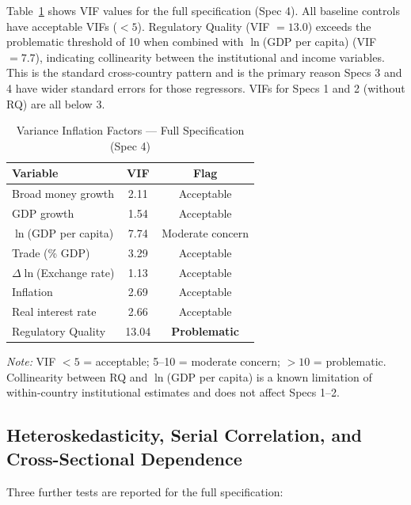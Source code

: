 Table~\ref{tab:vif-full} shows VIF values for the full specification (Spec 4). All baseline controls have acceptable VIFs ($< 5$). Regulatory Quality (VIF $= 13.0$) exceeds the problematic threshold of 10 when combined with $\ln$(GDP per capita) (VIF $= 7.7$), indicating collinearity between the institutional and income variables. This is the standard cross-country pattern and is the primary reason Specs 3 and 4 have wider standard errors for those regressors. VIFs for Specs 1 and 2 (without RQ) are all below 3.

\begin{table}[htbp]
\centering
\setlength{\tabcolsep}{5pt}
\renewcommand{\arraystretch}{0.95}
\caption{Variance Inflation Factors --- Full Specification (Spec 4)}
\label{tab:vif-full}
\begin{tabular}{lcc}
\hline\hline
Variable & VIF & Flag \\
\hline
Broad money growth        & 2.11 & Acceptable \\
GDP growth                & 1.54 & Acceptable \\
$\ln$(GDP per capita)     & 7.74 & Moderate concern \\
Trade (\% GDP)            & 3.29 & Acceptable \\
$\Delta\ln$(Exchange rate)& 1.13 & Acceptable \\
Inflation                 & 2.69 & Acceptable \\
Real interest rate        & 2.66 & Acceptable \\
Regulatory Quality        & 13.04 & \textbf{Problematic} \\
\hline\hline
\end{tabular}
\par\noindent\textit{Note:} VIF $< 5$ = acceptable; 5--10 = moderate concern; $> 10$ = problematic. Collinearity between RQ and $\ln$(GDP per capita) is a known limitation of within-country institutional estimates and does not affect Specs 1--2.
\end{table}

\subsection{Heteroskedasticity, Serial Correlation, and Cross-Sectional Dependence}
\label{subsec:other-diagnostics}

Three further tests are reported for the full specification:

